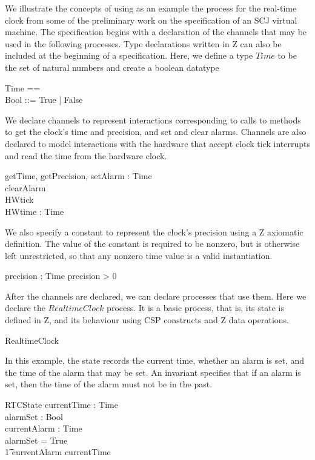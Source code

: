 \documentclass[a4paper,10pt]{report}
\begin{document}
We illustrate the concepts of \Circus{} using as an example the process for
the real-time clock from some of the preliminary work on the specification of an
SCJ virtual machine. The specification begins with a declaration of the channels
that may be used in the following processes.  Type declarations written in Z can
also be included at the beginning of a \Circus{} specification. Here, we define
a type $Time$ to be the set of natural numbers and create a boolean datatype
%
\begin{zed}
  Time == \nat \\
  Bool ::= True | False \\
\end{zed}
%
We declare channels to represent interactions corresponding to calls to methods
to get the clock's time and precision, and set and clear alarms. Channels are
also declared to model interactions with the hardware that accept clock tick
interrupts and read the time from the hardware clock.
%
\begin{circus}
  \circchannel getTime, getPrecision, setAlarm : Time \\
  \circchannel clearAlarm \\
  \circchannel HWtick \\
  \circchannel HWtime : Time \\
\end{circus}
%
We also specify a constant to represent the clock's precision using a Z
axiomatic definition. The value of the constant is required to be nonzero, but is
otherwise left unrestricted, so that any nonzero time value is a valid
instantiation.
%
\begin{axdef}
  precision : Time
\where
  precision > 0
\end{axdef}
%
After the channels are declared, we can declare processes that use them. Here we
declare the $RealtimeClock$ process. It is a basic process, that is, its state
is defined in Z, and its behaviour using CSP constructs and Z data operations.
%
\begin{circus}
  \circprocess RealtimeClock \circdef \circbegin
\end{circus}
%
In this example, the state records the current time, whether an alarm is set,
and the time of the alarm that may be set. An invariant specifies that if an
alarm is set, then the time of the alarm must not be in the past.
%
\begin{schema}{RTCState}
  currentTime  : Time \\
  alarmSet     : Bool \\
  currentAlarm : Time \\
\where
  alarmSet = True \implies \\
  \t1 currentAlarm \geq currentTime
\end{schema}
\end{document}

